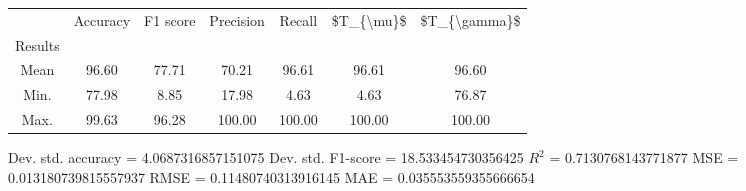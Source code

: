 \begin{tabular}{|c|c|c|c|c|c|c|}
\toprule
{} &  Accuracy &  F1 score &  Precision &  Recall &  \$T\_\{\textbackslash mu\}\$ &  \$T\_\{\textbackslash gamma\}\$ \\
Results &           &           &            &         &            &               \\
\hline
Mean    &     96.60 &     77.71 &      70.21 &   96.61 &      96.61 &         96.60 \\
Min.    &     77.98 &      8.85 &      17.98 &    4.63 &       4.63 &         76.87 \\
Max.    &     99.63 &     96.28 &     100.00 &  100.00 &     100.00 &        100.00 \\
\bottomrule
\end{tabular}

 Dev. std. accuracy = 4.0687316857151075
 Dev. std. F1-score = 18.533454730356425
 $R^2$ = 0.7130768143771877
 MSE = 0.013180739815557937
 RMSE = 0.11480740313916145
 MAE = 0.035553559355666654